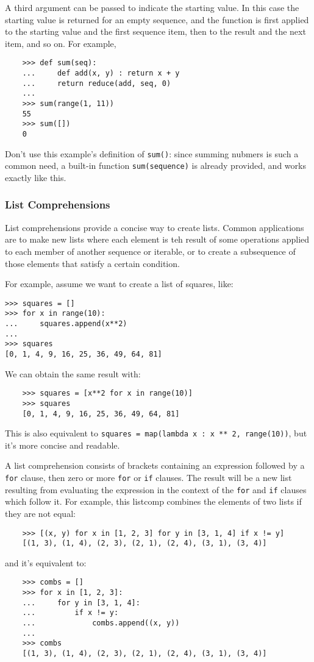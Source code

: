 \documentclass[UTF8]{article}
\begin{document}
A third argument can be passed to indicate the starting value. In this case the starting value is
returned for an empty sequence, and the function is first applied to the starting value and the
first sequence item, then to the result and the next item, and so on. For example,
\begin{verbatim}
    >>> def sum(seq):
    ...     def add(x, y) : return x + y
    ...     return reduce(add, seq, 0)
    ...
    >>> sum(range(1, 11))
    55
    >>> sum([])
    0
\end{verbatim}

Don't use this example's definition of \texttt{sum()}: since summing nubmers is such a common need,
a built-in function \texttt{sum(sequence)} is already provided, and works exactly like this.

\subsubsection{List Comprehensions}
List comprehensions provide a concise way to create lists. Common applications are to make new
lists where each element is teh result of some operations applied to each member of another
sequence or iterable, or to create a subsequence of those elements that satisfy a certain condition.

For example, assume we want to create a list of squares, like:
\begin{verbatim}
>>> squares = []
>>> for x in range(10):
...     squares.append(x**2)
...
>>> squares
[0, 1, 4, 9, 16, 25, 36, 49, 64, 81]
\end{verbatim}

We can obtain the same result with:
\begin{verbatim}
    >>> squares = [x**2 for x in range(10)]
    >>> squares
    [0, 1, 4, 9, 16, 25, 36, 49, 64, 81]
\end{verbatim}
This is also equivalent to \texttt{squares = map(lambda x : x ** 2, range(10))}, but
it's more concise and readable.

A list comprehension consists of brackets containing an expression followed by a \texttt{for}
clause, then zero or more \texttt{for} or \texttt{if} clauses. The result will be a new list
resulting from evaluating the expression in the context of the \texttt{for} and \texttt{if} clauses
which follow it. For example, this listcomp combines the elements of two lists if they are not
equal:
\begin{verbatim}
    >>> [(x, y) for x in [1, 2, 3] for y in [3, 1, 4] if x != y]
    [(1, 3), (1, 4), (2, 3), (2, 1), (2, 4), (3, 1), (3, 4)]
\end{verbatim}
and it's equivalent to:
\begin{verbatim}
    >>> combs = []
    >>> for x in [1, 2, 3]:
    ...     for y in [3, 1, 4]:
    ...         if x != y:
    ...             combs.append((x, y))
    ...
    >>> combs
    [(1, 3), (1, 4), (2, 3), (2, 1), (2, 4), (3, 1), (3, 4)]
\end{verbatim}
\end{document}
